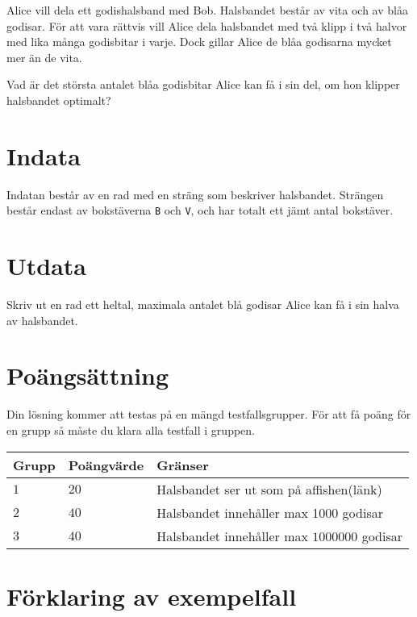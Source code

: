 Alice vill dela ett godishalsband med Bob. 
Halsbandet består av vita och av blåa godisar. 
För att vara rättvis vill Alice dela halsbandet med
två klipp i två halvor med lika många godisbitar i varje.
Dock gillar Alice de blåa godisarna mycket mer än de vita.

Vad är det största antalet blåa godisbitar Alice kan få i sin del,
om hon klipper halsbandet optimalt?

\section*{Indata}
Indatan består av en rad med en sträng som beskriver halsbandet.
Strängen består endast av bokstäverna \texttt{B} och \texttt{V},
och har totalt ett jämt antal bokstäver. 


\section*{Utdata}
Skriv ut en rad ett heltal, maximala antalet blå godisar Alice
kan få i sin halva av halsbandet.

\section*{Poängsättning}
Din lösning kommer att testas på en mängd testfallsgrupper.
För att få poäng för en grupp så måste du klara alla testfall i gruppen.

\noindent
\begin{tabular}{| l | l | l |}
\hline
Grupp & Poängvärde & Gränser \\ \hline
$1$    & $20$       &  Halsbandet ser ut som på affishen(länk) \\ \hline 
$2$    & $40$       &  Halsbandet innehåller max 1000 godisar\\ \hline 
$3$    & $40$       &  Halsbandet innehåller max $1000000$ godisar \\ \hline
\end{tabular}

\section*{Förklaring av exempelfall}
